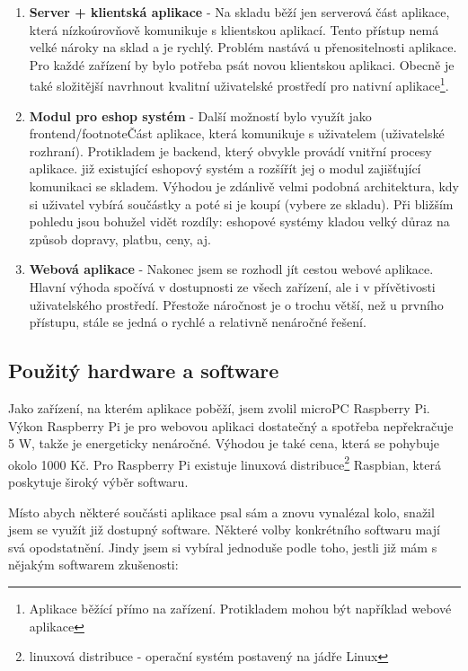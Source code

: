 \documentclass[12pt, a4paper, oneside]{article}
\begin{document}
\begin{enumerate}
\item \textbf{Server + klientská aplikace} - Na skladu běží jen serverová část aplikace, která nízkoúrovňově komunikuje s klientskou aplikací. Tento přístup nemá velké nároky na sklad a je rychlý. Problém nastává u přenositelnosti aplikace. Pro každé zařízení by bylo potřeba psát novou klientskou aplikaci. Obecně je také složitější navrhnout kvalitní uživatelské prostředí pro nativní aplikace\footnote{Aplikace běžící přímo na zařízení. Protikladem mohou být například webové aplikace}.
\item \textbf{Modul pro eshop systém} - Další možností bylo využít jako frontend/footnote{Část aplikace, která komunikuje s uživatelem (uživatelské rozhraní). Protikladem je backend, který obvykle provádí vnitřní procesy aplikace.} již existující eshopový systém a rozšířít jej o modul zajišťující komunikaci se skladem. Výhodou je zdánlivě velmi podobná architektura, kdy si uživatel vybírá součástky a poté si je koupí (vybere ze skladu). Při bližším pohledu jsou bohužel vidět rozdíly: eshopové systémy kladou velký důraz na způsob dopravy, platbu, ceny, aj.
\item \textbf{Webová aplikace} - Nakonec jsem se rozhodl jít cestou webové aplikace. Hlavní výhoda spočívá v dostupnosti ze všech zařízení, ale i v přívětivosti uživatelského prostředí. Přestože náročnost je o trochu větší, než u prvního přístupu, stále se jedná o rychlé a relativně nenáročné řešení.
\end{enumerate}


\subsection{Použitý hardware a software}

Jako zařízení, na kterém aplikace poběží, jsem zvolil microPC Raspberry Pi. Výkon Raspberry Pi je pro webovou aplikaci dostatečný a spotřeba nepřekračuje 5 W, takže je energeticky nenáročné. Výhodou je také cena, která se pohybuje okolo 1000 Kč. Pro Raspberry Pi existuje linuxová distribuce\footnote{linuxová distribuce - operační systém postavený na jádře Linux} Raspbian, která poskytuje široký výběr softwaru.

Místo abych některé součásti aplikace psal sám a znovu vynalézal kolo, snažil jsem se využít již dostupný software. Některé volby konkrétního softwaru mají svá opodstatnění. Jindy jsem si vybíral jednoduše podle toho, jestli již mám s nějakým softwarem zkušenosti:
\end{document}
